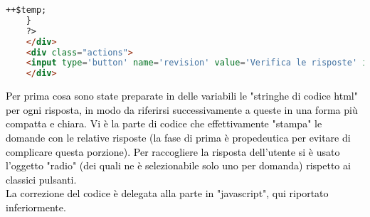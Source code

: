\begin{lstlisting}[language=html]
		++$temp;
	}
	?>
	</div>
	<div class="actions">
	<input type='button' name='revision' value='Verifica le risposte' id='revision' onclick='check()'/>
	</div>
\end{lstlisting}

\textcolor{black}{Per prima cosa sono state preparate in delle variabili le "stringhe di codice html" per ogni risposta, in modo da riferirsi successivamente a queste in una forma più compatta e chiara. Vi è la parte di codice che effettivamente "stampa" le domande con le relative risposte (la fase di prima è propedeutica per evitare di complicare questa porzione). Per raccogliere la risposta dell'utente si è usato l'oggetto "radio" (dei quali ne è selezionabile solo uno per domanda) rispetto ai classici pulsanti.\\ 
La correzione del codice è delegata alla parte in "javascript", qui riportato inferiormente.}\\

